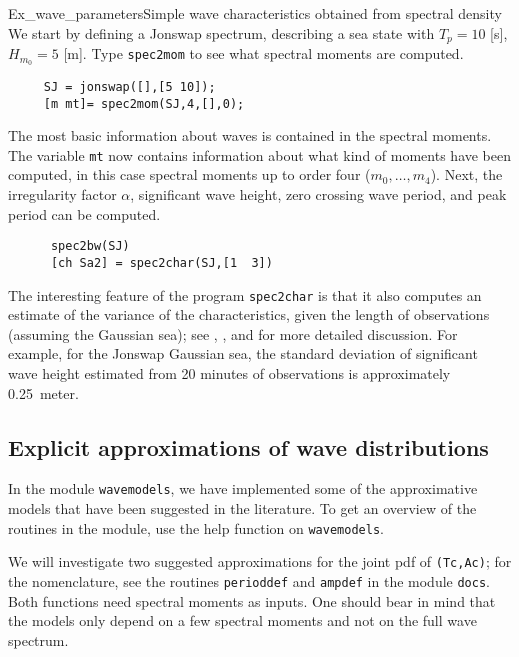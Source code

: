 \begin{rtex}{Ex_wave_parameters}{Simple wave characteristics obtained
    from spectral density}
We start by defining a {\sc Jonswap} spectrum, describing a sea state with
$T_p = 10$ [s], $H_{m_0} = 5$ [m]. Type \verb+spec2mom+ to see what
spectral moments are computed. 
{\small\begin{verbatim}
     SJ = jonswap([],[5 10]);
     [m mt]= spec2mom(SJ,4,[],0);
\end{verbatim}}

The most basic information about waves is contained
in the spectral moments. The variable {\tt mt} now contains information
about what kind of moments have been computed, in this case spectral
moments up to order four ($m_0, \ldots , m_4$). Next, the irregularity
factor $\alpha$, significant wave height, zero crossing wave period,
and peak period can be computed.
{\small\begin{verbatim}
      spec2bw(SJ)
      [ch Sa2] = spec2char(SJ,[1  3])
\end{verbatim}}

The interesting feature of the  program {\tt spec2char} is that it
also computes an estimate of the variance of the characteristics, given
the length of observations (assuming the Gaussian sea); see
\cite{KrogstadEtal1999Methods}, \cite{Tucker1993recommended}, %
and \cite{Young1999Wind} %
for more detailed
discussion. For example, for the {\sc Jonswap} Gaussian sea,
the standard deviation of significant wave height estimated from 20 minutes
of observations is approximately 0.25~meter.
\end{rtex}

\subsection{Explicit approximations of wave distributions}
\label{sec:explicit_approximations}

In the module {\tt wavemodels}, we have implemented some of
the approximative models that have been suggested in the literature.
To get an overview of the routines in the module, use the help function on
{\tt wavemodels}.

We will investigate two suggested approximations for the joint pdf of
{\tt (Tc,Ac)}; for the nomenclature, see the routines {\tt perioddef} and
{\tt ampdef} in the module {\tt docs}. Both  functions
need spectral moments as inputs. One should bear in mind that the
models only depend on a few spectral moments and not
on the full wave spectrum.

